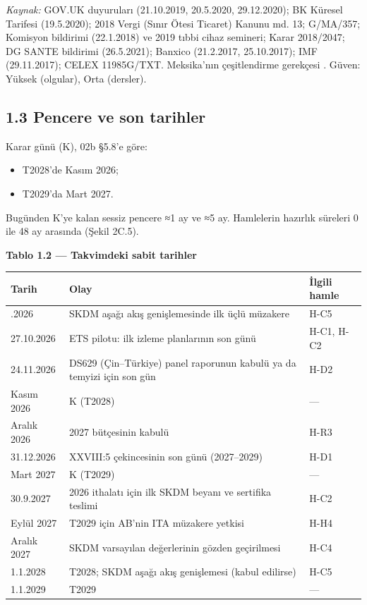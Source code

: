 \endgroup

\emph{Kaynak:} \etiketV{} GOV.UK duyuruları (21.10.2019, 20.5.2020, 29.12.2020); BK Küresel Tarifesi (19.5.2020); 2018 Vergi (Sınır Ötesi Ticaret) Kanunu md. 13; G/MA/357; Komisyon bildirimi (22.1.2018) ve 2019 tıbbi cihaz semineri; Karar 2018/2047; DG SANTE bildirimi (26.5.2021); Banxico (21.2.2017, 25.10.2017); IMF (29.11.2017); CELEX 11985G/TXT. Meksika'nın çeşitlendirme gerekçesi \etiketT{}. Güven: Yüksek (olgular), Orta (dersler).

\hypertarget{02c_hazirlik-13-pencere-ve-son-tarihler}{%
\subsection{1.3 Pencere ve son tarihler}\label{02c_hazirlik-13-pencere-ve-son-tarihler}}

Karar günü (K), 02b §5.8'e göre:

\begin{itemize}
\tightlist
\item
  T2028'de Kasım 2026;
\item
  T2029'da Mart 2027.
\end{itemize}

Bugünden K'ye kalan sessiz pencere ≈1 ay ve ≈5 ay. Hamlelerin hazırlık süreleri 0 ile 48 ay arasında (Şekil 2C.5).


\textbf{Tablo 1.2 --- Takvimdeki sabit tarihler}

\nopagebreak[4]

\begingroup\gbtablo\small

\begin{longtable}[]{@{}lll@{}}
\toprule\noalign{}
\textbf{Tarih} & \textbf{Olay} & \textbf{İlgili hamle} \\
\midrule\noalign{}
\endhead
\bottomrule\noalign{}
\endlastfoot
20.10.2026 & SKDM aşağı akış genişlemesinde ilk üçlü müzakere & H-C5 \\
27.10.2026 & ETS pilotu: ilk izleme planlarının son günü & H-C1, H-C2 \\
24.11.2026 & DS629 (Çin--Türkiye) panel raporunun kabulü ya da temyizi için son gün & H-D2 \\
Kasım 2026 & K (T2028) & --- \\
Aralık 2026 & 2027 bütçesinin kabulü & H-R3 \\
31.12.2026 & XXVIII:5 çekincesinin son günü (2027--2029) & H-D1 \\
Mart 2027 & K (T2029) & --- \\
30.9.2027 & 2026 ithalatı için ilk SKDM beyanı ve sertifika teslimi & H-C2 \\
Eylül 2027 & T2029 için AB'nin ITA müzakere yetkisi & H-H4 \\
Aralık 2027 & SKDM varsayılan değerlerinin gözden geçirilmesi & H-C4 \\
1.1.2028 & T2028; SKDM aşağı akış genişlemesi (kabul edilirse) & H-C5 \\
1.1.2029 & T2029 & --- \\
\end{longtable}

